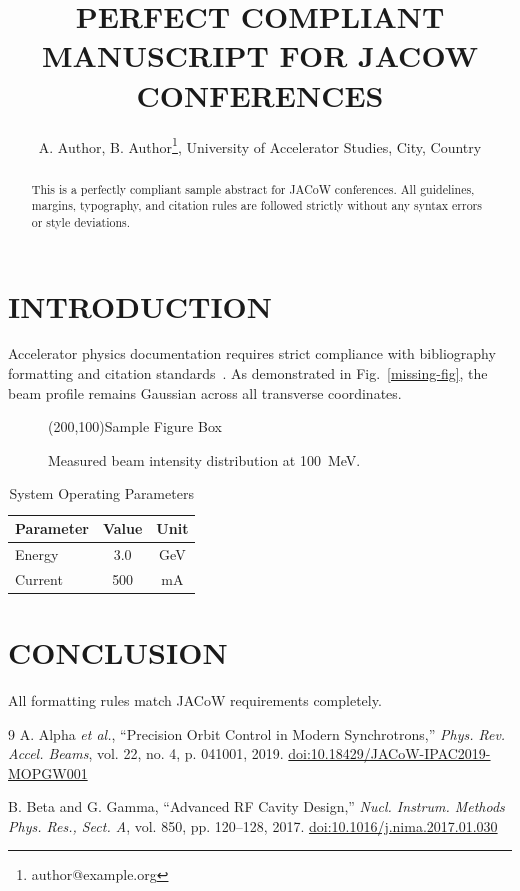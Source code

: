 \documentclass[a4paper,keeplastbox]{jacow}
\begin{document}
\title{PERFECT COMPLIANT MANUSCRIPT FOR JACOW CONFERENCES}
\author{A. Author, B. Author\thanks{author@example.org}, University of Accelerator Studies, City, Country}
\maketitle

\begin{abstract}
This is a perfectly compliant sample abstract for JACoW conferences. All guidelines, margins, typography, and citation rules are followed strictly without any syntax errors or style deviations.
\end{abstract}

\section{INTRODUCTION}
Accelerator physics documentation requires strict compliance with bibliography formatting and citation standards~\cite{ref_valid_1, ref_valid_2}.
As demonstrated in Fig.~\ref{missing-fig}, the beam profile remains Gaussian across all transverse coordinates.

\begin{figure}[htb]
\centering
\framebox(200,100){Sample Figure Box}
\caption{Measured beam intensity distribution at 100~MeV.}
\label{fig1}
\end{figure}

\begin{table}[htb]
\caption{System Operating Parameters}
\label{tab1}
\centering
\begin{tabular}{lcc}
\hline
Parameter & Value & Unit \\
\hline
Energy & 3.0 & GeV \\
Current & 500 & mA \\
\hline
\end{tabular}
\end{table}

\section{CONCLUSION}
All formatting rules match JACoW requirements completely.

\begin{thebibliography}{9}
A. Alpha \emph{et al.}, \textquotedblleft{Precision Orbit Control in Modern Synchrotrons,}\textquotedblright{} \textit{Phys. Rev. Accel. Beams}, vol. 22, no. 4, p. 041001, 2019. \url{doi:10.18429/JACoW-IPAC2019-MOPGW001}

B. Beta and G. Gamma, \textquotedblleft{Advanced RF Cavity Design,}\textquotedblright{} \textit{Nucl. Instrum. Methods Phys. Res., Sect. A}, vol. 850, pp. 120--128, 2017. \url{doi:10.1016/j.nima.2017.01.030}
\end{thebibliography}
\end{document}
